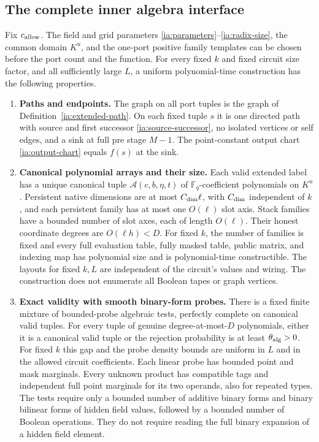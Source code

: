 \subsection{The complete inner algebra interface}\label{ia:interface}

\begin{lemma}\label{lem:inner-algebra-interface}
Fix $c_{\rm allow}$.  The field and grid parameters
\eqref{ia:parameters}--\eqref{ia:radix-size}, the common domain
$K^u$, and the one-port positive family templates can be chosen
before the port count and the function.  For every fixed $k$ and
fixed circuit size factor, and all sufficiently large $L$, a
uniform polynomial-time construction has the following properties.
\begin{enumerate}
\item \textbf{Paths and endpoints.}
The graph on all port tuples is the graph of
Definition~\ref{ia:extended-path}.  On each fixed tuple $s$ it is
one directed path with source and first successor
\eqref{ia:source-successor}, no isolated vertices or self edges,
and a sink at full pre stage $M-1$.  The point-constant output
chart \eqref{ia:output-chart} equals $f(s)$ at the sink.

\item \textbf{Canonical polynomial arrays and their size.}
Each valid extended label has a unique canonical tuple
$\mathcal A(c,b,\eta,t)$ of $\mathbb F_q$-coefficient polynomials
on $K^u$.  Persistent native dimensions are at most
$C_{\rm dim}\ell$, with $C_{\rm dim}$ independent of $k$, and
each persistent family has at most one $O(\ell)$ slot axis.
Stack families have a bounded number of slot axes, each of length
$O(\ell)$.  Their honest coordinate degrees are $O(\ell h)<D$.
For fixed $k$, the number of families is fixed and every full
evaluation table, fully masked table, public matrix, and indexing
map has polynomial size and is polynomial-time constructible.
The layouts for fixed $k,L$ are independent of the circuit's
values and wiring.  The construction does not enumerate all
Boolean tapes or graph vertices.

\item \textbf{Exact validity with smooth binary-form probes.}
There is a fixed finite mixture of bounded-probe algebraic tests,
perfectly complete on canonical valid tuples.  For every tuple
of genuine degree-at-most-$D$ polynomials, either it is a
canonical valid tuple or the rejection probability is at least
$\theta_{\rm alg}>0$.  For fixed $k$ this gap and the probe density
bounds are uniform in $L$ and in the allowed circuit coefficients.
Each linear probe has bounded point and mask marginals.  Every
unknown product has compatible tags and independent full point
marginals for its two operands, also for repeated types.
The tests require only a bounded number of additive binary forms
and binary bilinear forms of hidden field values, followed by a
bounded number of Boolean operations.  They do not require reading
the full binary expansion of a hidden field element.


\end{enumerate}
\end{lemma}
